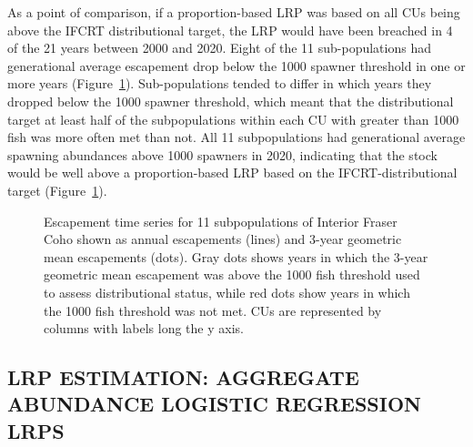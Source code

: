\documentclass[11pt]{book}
\begin{document}
As a point of comparison, if a proportion-based LRP was based on all CUs being above the IFCRT distributional target, the LRP would have been breached in 4 of the 21 years between 2000 and 2020. Eight of the 11 sub-populations had generational average escapement drop below the 1000 spawner threshold in one or more years (Figure~\ref{fig:coho-Subpop-timeseries}). Sub-populations tended to differ in which years they dropped below the 1000 spawner threshold, which meant that the distributional target at least half of the subpopulations within each CU with greater than 1000 fish was more often met than not. All 11 subpopulations had generational average spawning abundances above 1000 spawners in 2020, indicating that the stock would be well above a proportion-based LRP based on the IFCRT-distributional target (Figure~\ref{fig:coho-Subpop-timeseries}).
\begin{figure}[htb]

{\centering {} 

}

\caption{Escapement time series for 11 subpopulations of Interior Fraser Coho shown as annual escapements (lines) and 3-year geometric mean escapements (dots). Gray dots shows years in which the 3-year geometric mean escapement was above the 1000 fish threshold used to assess distributional status, while red dots show years in which the 1000 fish threshold was not met. CUs are represented by columns with labels long the y axis.}\label{fig:coho-Subpop-timeseries}
\end{figure}
\hypertarget{lrp-estimation-aggregate-abundance-logistic-regression-lrps}{%
\subsection{LRP ESTIMATION: AGGREGATE ABUNDANCE LOGISTIC REGRESSION LRPS}\label{lrp-estimation-aggregate-abundance-logistic-regression-lrps}}
\end{document}
